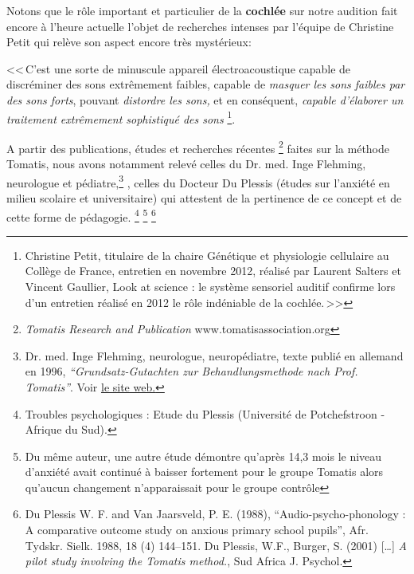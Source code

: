 {\begin{quotation}
\end{quotation}


 Notons que le  rôle important et
particulier 
de la \textbf{cochlée} sur notre audition fait encore à l'heure
actuelle l'objet de recherches intenses
par l'équipe de Christine Petit qui relève
son aspect encore très mystérieux:

<<\,C'est une sorte de minuscule appareil électroacoustique capable
de discréminer des sons extrêmement faibles, capable de \emph{masquer
les sons faibles par des sons forts}, pouvant \emph{distordre les
sons,} et en conséquent, \emph{capable d'élaborer un traitement extrêmement
sophistiqué des sons}%
\footnote{Christine Petit, titulaire de la chaire Génétique et
physiologie cellulaire au Collège de France, entretien en novembre 2012, 
réalisé par Laurent Salters et Vincent Gaullier, 
Look at science : le système sensoriel auditif confirme 
lors d'un entretien réalisé en 2012 le rôle indéniable de la cochlée.\,>>}.



 
 

 A partir des publications, études et recherches récentes \footnote{\emph{Tomatis Research and Publication} www.tomatisassociation.org}    faites sur la
 méthode Tomatis, nous avons notamment
 relevé celles du Dr. med. Inge Flehming, neurologue et 
pédiatre,\footnote{Dr. med. Inge Flehming,
	neurologue, neuropédiatre, texte publié en allemand
	en 1996, \emph{``Grundsatz-Gutachten zur Behandlungsmethode
		nach Prof. Tomatis''}. Voir 
\href{http://www.analytische-hoertherapie.de/uploads/tx\_templavoila/Grundsatzgu
tachten\_zur\_Behandlungsmethode\_nach\_Prof.\_Tomatis.pdf}{le site web.}}
 , celles du Docteur Du Plessis (études sur l'anxiété en
 milieu scolaire et universitaire) qui  attestent de la pertinence de ce
 concept et de cette forme de pédagogie. \footnote{Troubles 
psychologiques : Etude du Plessis (Université de Potchefstroon
- Afrique du Sud).}  \footnote{Du même auteur, une autre étude démontre qu'après 14,3
mois le niveau d'an\-xié\-té avait continué à baisser fortement
pour le groupe Tomatis alors qu'aucun
changement n'apparaissait pour le groupe contrôle}%
\footnote{Du Plessis W. F. and Van Jaarsveld, P. E. (1988),
	``Audio-psycho-phonology : A comparative outcome study on anxious 
primary school pupils'',  Afr. Tydskr. Sielk. 1988,
	18 (4) 144--151. Du Plessis, W.F., Burger, S. (2001) [\ldots]
	\emph{A pilot study involving the Tomatis method.}, Sud Africa J. 
Psychol.}
 
}
